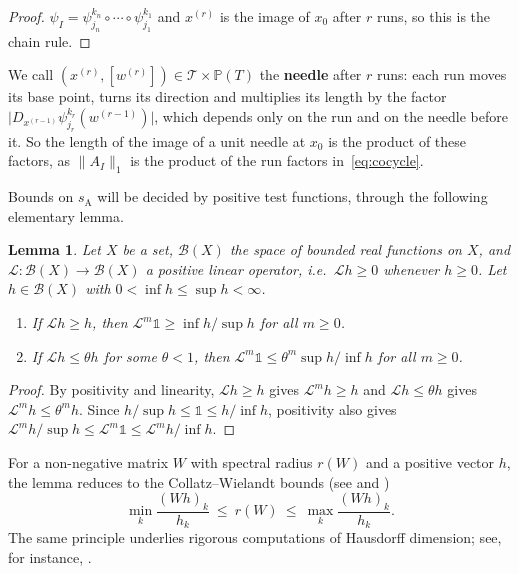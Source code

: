 \documentclass[11pt]{amsart}
\newtheorem{lemma}[proposition]{Lemma}
\theoremstyle{definition}
\theoremstyle{remark}
\newcommand{\cT}{\mathcal T}
\newcommand{\sA}{s_{\mathrm A}}
\newcommand{\abs}[1]{\lvert #1\rvert}
\newcommand{\norm}[1]{\lVert #1\rVert}
\newcommand{\PT}{\mathbb P(T)}
\begin{document}
\begin{proof}
$\psi_I=\psi_{j_n}^{k_n}\circ\cdots\circ\psi_{j_1}^{k_1}$ and $x^{(r)}$ is the image of $x_0$
after $r$ runs, so this is the chain rule.
\end{proof}

We call $(x^{(r)},[w^{(r)}])\in\cT\times\PT$ the \textbf{needle} after $r$ runs: each run moves its base point, turns its direction and multiplies its length by the factor $\abs{D_{x^{(r-1)}}\psi_{j_r}^{k_r}(w^{(r-1)})}$, which depends only on the run and on the needle before it. So the length of the image of a unit needle at $x_0$ is the product of these factors, as $\norm{A_I}_1$ is the product of the run factors in~\eqref{eq:cocycle}.

Bounds on $\sA$ will be decided by positive test functions, through the following elementary lemma.

\begin{lemma}\label{lem:test}
Let $X$ be a set, $\mathcal B(X)$ the space of bounded real functions on $X$, and
$\mathcal L:\mathcal B(X)\to\mathcal B(X)$ a positive linear operator, i.e.\
$\mathcal Lh\ge0$ whenever $h\ge0$. Let $h\in\mathcal B(X)$ with
$0<\inf h\le\sup h<\infty$.
\begin{enumerate}
\item[(i)] If $\mathcal Lh\ge h$, then $\mathcal L^m\mathds 1\ge\inf h/\sup h$ for all $m\ge0$.
\item[(ii)] If $\mathcal Lh\le\theta h$ for some $\theta<1$, then
  $\mathcal L^m\mathds 1\le\theta^m\sup h/\inf h$ for all $m\ge0$.
\end{enumerate}
\end{lemma}

\begin{proof}
    By positivity and linearity, $\mathcal Lh\ge h$ gives $\mathcal L^mh\ge h$ and
    $\mathcal Lh\le\theta h$ gives $\mathcal L^mh\le\theta^mh$. 
    Since $h/\sup h\le\mathds 1\le h/\inf h$, positivity also gives
    $\mathcal L^mh/\sup h\le\mathcal L^m\mathds 1\le\mathcal L^mh/\inf h$.
\end{proof}

For a non-negative matrix $W$ with spectral radius $r(W)$ and a positive vector
$h$, the lemma reduces to the Collatz--Wielandt bounds (see \cite{Col42,Wie50} and
\cite[Thm.~8.1.26]{HJ85})
\[
  \min_k\frac{(Wh)_k}{h_k}\ \le\ r(W)\ \le\ \max_k\frac{(Wh)_k}{h_k}.
\]
The same principle underlies rigorous computations of Hausdorff dimension; see, for
instance, \cite[Lemma~2.2]{FN18}.
\end{document}
